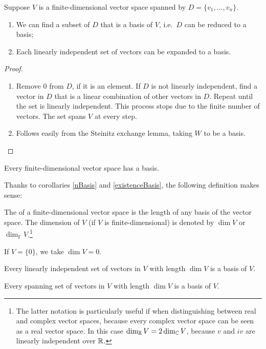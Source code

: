 \begin{theorem}
Suppose $V$ is a finite-dimensional vector space spanned by $D = \{v_1, \ldots, v_n\}$.
\begin{enumerate}
\item We can find a subset of $D$ that is a basis of $V$, i.e.\ $D$ can be reduced to a basis;
\item Each linearly independent set of vectors can be expanded to a basis.
\end{enumerate}
\label{basis}
\end{theorem}
\begin{proof}
\begin{enumerate}
\item Remove $0$ from $D$, if it is an element. If $D$ is not linearly independent, find a vector in $D$ that is a linear combination of other vectors in $D$. Repeat until the set is linearly independent. This process stops due to the finite number of vectors. The set spans $V$ at every step.
\item Follows easily from the Steinitz exchange lemma, taking $W$ to be a basis.
\end{enumerate}
\end{proof}
\begin{corollary}
Every finite-dimensional vector space has a basis. \label{existenceBasis}
\end{corollary}

Thanks to corollaries \ref{nBasis} and \ref{existenceBasis}, the following definition makes sense:
\begin{definition}
The  of a finite-dimensional vector space is the length of any basis of the vector space.
The dimension of $V$ (if $V$ is finite-dimensional) is denoted by $\dim V$ or $\dim_\mathbb{F}V$.\footnote{The latter notation is particularly useful if when distinguishing between real and complex vector spaces, because every complex vector space can be seen as a real vector space. In this case $\dim_{\mathbb{R}} V = 2\dim_{\mathbb{C}} V$, because $v$ and $iv$ are linearly independent over $\mathbb{R}$.}

If $V = \{0\}$, we take $\dim V = 0$.
\end{definition}

\begin{corollary}
Every linearly independent set of vectors in $V$ with length $\dim V$ is a basis of $V$. \label{maxLinearlyIndependent}
\end{corollary}
\begin{corollary}
Every spanning set of vectors in $V$ with length $\dim V$ is a basis of $V$.
\end{corollary}

